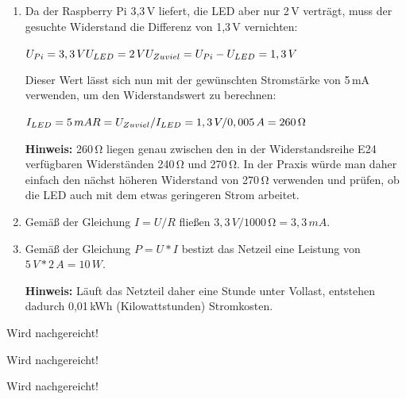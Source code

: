 \begin{enumerate}
    \item Da der Raspberry Pi 3,3\,V liefert, die LED aber nur 2\,V verträgt,
    muss der gesuchte Widerstand die Differenz von 1,3\,V \glqq{}vernichten\grqq{}:

    $
        U_{Pi} = 3,3\,V \\
        U_{LED} = 2\,V \\
        \smallskip
        U_{Zuviel} = U_{Pi} - U_{LED} = 1,3\,V
    $

    Dieser Wert lässt sich nun mit der gewünschten Stromstärke von 5\,mA verwenden,
    um den Widerstandswert zu berechnen:

    $
        I_{LED} = 5\,mA \\
        \smallskip
        R = U_{Zuviel} / I_{LED} = 1,3\,V / 0,005\,A = 260\,\si{\ohm}
    $

    \textbf{Hinweis:} 260\,\si{\ohm} liegen genau zwischen den in der Widerstandsreihe
    E24 verfügbaren Widerständen 240\,\si{\ohm} und 270\,\si{\ohm}. In der Praxis
    würde man daher einfach den nächst höheren Widerstand von 270\,\si{\ohm} verwenden
    und prüfen, ob die LED auch mit dem etwas geringeren Strom arbeitet.

    \item Gemäß der Gleichung $I = U / R$ fließen $3,3\,V / 1000\,\si{\ohm} = 3,3\,mA$.

    \item Gemäß der Gleichung $P = U * I$ bestizt das Netzeil eine Leistung von
    $5\,V * 2\,A = 10\,W$.

    \textbf{Hinweis:} Läuft das Netzteil daher eine Stunde unter Vollast, entstehen
    dadurch 0,01\,kWh (Kilowattstunden) Stromkosten.
\end{enumerate}

Wird nachgereicht!

Wird nachgereicht!

Wird nachgereicht!
